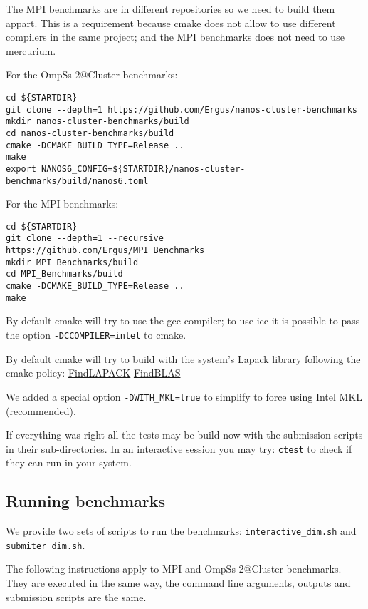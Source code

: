 \documentclass{article}
\newcommand{\code}[1]{\texttt{#1}}
\begin{document}
The MPI benchmarks are in different repositories so we need to build
them appart. This is a requirement because cmake does not allow to use
different compilers in the same project; and the MPI benchmarks does
not need to use mercurium.

For the OmpSs-2@Cluster benchmarks:

\begin{lstlisting}
cd ${STARTDIR}
git clone --depth=1 https://github.com/Ergus/nanos-cluster-benchmarks
mkdir nanos-cluster-benchmarks/build
cd nanos-cluster-benchmarks/build
cmake -DCMAKE_BUILD_TYPE=Release ..
make
export NANOS6_CONFIG=${STARTDIR}/nanos-cluster-benchmarks/build/nanos6.toml
\end{lstlisting}

For the MPI benchmarks:

\begin{lstlisting}
cd ${STARTDIR}
git clone --depth=1 --recursive https://github.com/Ergus/MPI_Benchmarks
mkdir MPI_Benchmarks/build
cd MPI_Benchmarks/build
cmake -DCMAKE_BUILD_TYPE=Release ..
make
\end{lstlisting}

By default cmake will try to use the gcc compiler; to use icc it is
possible to pass the option \code{-DCCOMPILER=intel} to cmake.

By default cmake will try to build with the system's Lapack library
following the cmake policy:
\href{https://cmake.org/cmake/help/latest/module/FindLAPACK.html}{FindLAPACK}
\href{https://cmake.org/cmake/help/latest/module/FindBLAS.html}{FindBLAS}

We added a special option \code{-DWITH\_MKL=true} to simplify to force
using Intel MKL (recommended).

If everything was right all the tests may be build now with the
submission scripts in their sub-directories. In an interactive session
you may try: \code{ctest} to check if they can run in your system.

\subsection{Running benchmarks}

We provide two sets of scripts to run the benchmarks:
\code{interactive\_dim.sh} and \code{submiter\_dim.sh}.

The following instructions apply to MPI and OmpSs-2@Cluster
benchmarks.  They are executed in the same way, the command line
arguments, outputs and submission scripts are the same.
\end{document}
